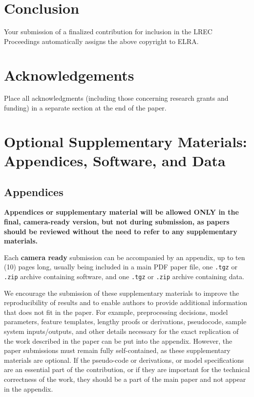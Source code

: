 \documentclass[10pt, a4paper]{article}
\begin{document}
\section{Conclusion}

Your submission of a finalized contribution for inclusion in the LREC Proceedings automatically assigns the above copyright to ELRA.

\section{Acknowledgements}

Place all acknowledgments (including those concerning research grants and funding) in a separate section at the end of the paper.

\section{Optional Supplementary Materials: Appendices, Software, and Data}

\subsection{Appendices}

\textbf{Appendices or supplementary material will be allowed ONLY in the final, camera-ready version, but not during submission, as papers should be reviewed without the need to refer to any supplementary materials.}

Each \textbf{camera ready} submission can be accompanied by an appendix, up to ten (10) pages long, usually being included in a main PDF paper file, one \texttt{.tgz} or \texttt{.zip} archive containing software, and one \texttt{.tgz} or \texttt{.zip} archive containing data.

We encourage the submission of these supplementary materials to improve the reproducibility of results and to enable authors to provide additional information that does not fit in the paper. For example, preprocessing decisions, model parameters, feature templates, lengthy proofs or derivations, pseudocode, sample system inputs/outputs, and other details necessary for the exact replication of the work described in the paper can be put into the appendix. However, the paper submissions must remain fully self-contained, as these supplementary materials are optional. If the pseudo-code or derivations, or model specifications are an essential part of the contribution, or if they are important for the technical correctness of the work, they should be a part of the main paper and not appear in the appendix.
\end{document}
